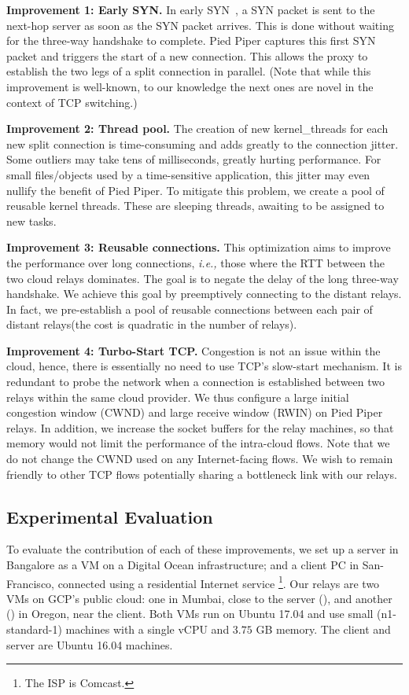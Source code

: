 \documentclass[newfonts=false,format=sigconf,10pt,letterpaper]{acmart}
\providecommand{\ie}{\emph{i.e.,} }
\newcommand{\T}[1]{\smallskip\noindent\textbf{#1}} %
\newcommand{\oursys}{Pied Piper\xspace}
\newcommand{\proxies}{relays\xspace}
\newcommand{\reconn}{reusable connections\xspace}
\begin{document}
\T{Improvement 1: Early SYN.} In early SYN~\cite{ladiwala,siracusano2016miniproxy}, a SYN packet is sent to the next-hop server as soon as the SYN packet arrives. This is done without waiting for the three-way handshake to complete. \oursys captures this first SYN packet and triggers the start of a new connection. This allows the proxy to establish the two legs of a split connection in parallel. (Note that while this improvement is well-known, to our knowledge the next ones are novel in the context of TCP switching.)

\T{Improvement 2: Thread pool.} 
The creation of new kernel\_threads for each new split connection is time-consuming and adds greatly to the connection jitter. Some outliers may take tens of milliseconds, greatly hurting performance. For small files/objects used by a time-sensitive application, this jitter may even nullify the benefit of \oursys. To mitigate this problem, we create a pool of reusable kernel threads. These are sleeping threads, awaiting to be assigned to new tasks.

\T{Improvement 3: Reusable connections.}  This optimization aims to improve the performance over long connections, \ie those where the RTT between the two cloud relays dominates. The goal is to negate the delay of the long three-way handshake. We achieve this goal by preemptively connecting to the distant \proxies. In fact, we pre-establish a pool of \reconn between each pair of distant \proxies (the cost is quadratic in the number of \proxies).

\T{Improvement 4: Turbo-Start TCP.} 
Congestion is not an issue within the cloud, hence, there is essentially no need to use TCP's slow-start mechanism. It is redundant to probe the network when a connection is established between two \proxies within the same cloud provider. We thus configure a large initial congestion window (CWND) and large receive window (RWIN) on \oursys \proxies. In addition, we increase the socket buffers for the relay machines, so that memory would not limit the performance of the intra-cloud flows.
Note that we do not change the CWND used on any Internet-facing flows. We wish to remain friendly to other TCP flows potentially sharing a bottleneck link with our \proxies. 

\subsection{Experimental Evaluation}\label{subsec:improving-baseline}
To evaluate the contribution of each of these improvements, we set up a server in Bangalore as a VM on a Digital Ocean infrastructure; and a client PC in San-Francisco, connected using a residential Internet service \footnote{The ISP is Comcast.}. Our relays are two VMs on GCP's public cloud: one in Mumbai, close to the server (\rs), and another (\rc)  in Oregon, near the client. Both VMs run on Ubuntu 17.04 and use small (n1-standard-1) machines with a single vCPU and $3.75$ GB memory. The client and server are Ubuntu 16.04 machines.
\end{document}
